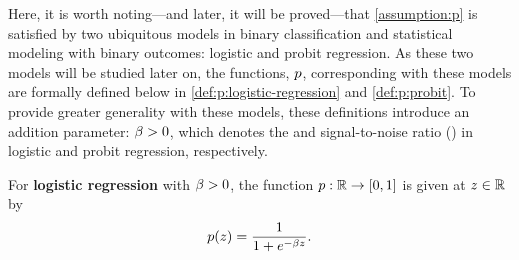 Here, it is worth noting---and later, it will be proved---that \ASSUMPTION \ref{assumption:p} is satisfied by two ubiquitous models in binary classification and statistical modeling with binary outcomes: logistic and probit regression.
As these two models will be studied later on, the functions, \(  p  \), corresponding with these models are formally defined below in \DEFINITION \ref{def:p:logistic-regression} and \ref{def:p:probit}.
To provide greater generality with these models, these definitions introduce an addition parameter: \(  \beta > 0  \), which denotes the \betaXnamelr and signal-to-noise ratio (\betaXnamepr) in logistic and probit regression, respectively.
%
\begin{definition}
\label{def:p:logistic-regression}
%
For {\bf logistic regression} with \betaXnamelr \(  \beta > 0  \), the function
\(  p : \mathbb{R} \to [0,1]  \)
is given at \(  z \in \mathbb{R}  \) by
\begin{gather}
  p( z )
  =
  \frac{1}{1+e^{-\beta z}}
.\end{gather}
\end{definition}
%
